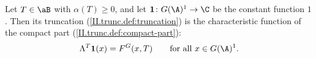 Let $T\in\aB$ with $\alpha(T)\ge0$, and let $\mathbf 1\colon G(\A)^1\to\C$ be the constant function $1$. Then its truncation
(\cref{II.trunc.def:truncation}) is the characteristic function of the compact part (\cref{II.trunc.def:compact-part}):
\[
  \Lambda^T\mathbf 1(x)=F^G(x,T)\qquad\text{for all }x\in G(\A)^1 .
\]
